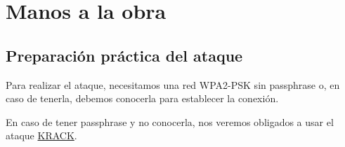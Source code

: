 \chapter{Manos a la obra}
\section{Preparación práctica del ataque} 
Para realizar el ataque, necesitamos una red WPA2-PSK sin passphrase o, en caso de tenerla, debemos conocerla para establecer la conexión.

\Nota En caso de tener passphrase y no conocerla, nos veremos obligados a usar el ataque \hyperlink{krack}{KRACK}.


